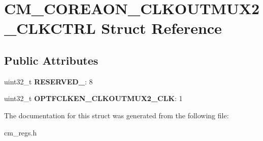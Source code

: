 \hypertarget{structCM__COREAON__CLKOUTMUX2__CLKCTRL}{\section{C\-M\-\_\-\-C\-O\-R\-E\-A\-O\-N\-\_\-\-C\-L\-K\-O\-U\-T\-M\-U\-X2\-\_\-\-C\-L\-K\-C\-T\-R\-L Struct Reference}
\label{structCM__COREAON__CLKOUTMUX2__CLKCTRL}
}
\subsection*{Public Attributes}
\begin{DoxyCompactItemize}
\item 
\hypertarget{structCM__COREAON__CLKOUTMUX2__CLKCTRL_adf6b04c7062c64c2cdb59f3399c2c982}{uint32\-\_\-t {\bfseries R\-E\-S\-E\-R\-V\-E\-D\-\_}\-: 8}\label{structCM__COREAON__CLKOUTMUX2__CLKCTRL_adf6b04c7062c64c2cdb59f3399c2c982}

\item 
\hypertarget{structCM__COREAON__CLKOUTMUX2__CLKCTRL_a0862ddc3171cac299d7fe34062765809}{uint32\-\_\-t {\bfseries O\-P\-T\-F\-C\-L\-K\-E\-N\-\_\-\-C\-L\-K\-O\-U\-T\-M\-U\-X2\-\_\-\-C\-L\-K}\-: 1}\label{structCM__COREAON__CLKOUTMUX2__CLKCTRL_a0862ddc3171cac299d7fe34062765809}

\end{DoxyCompactItemize}


The documentation for this struct was generated from the following file\-:\begin{DoxyCompactItemize}
\item 
cm\-\_\-regs.\-h\end{DoxyCompactItemize}
